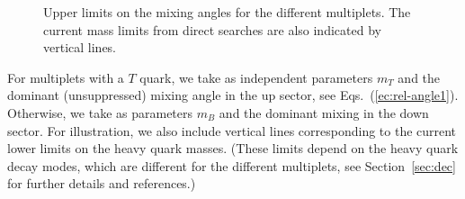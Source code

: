 \documentclass[12pt,a4paper]{article}
\begin{document}
\begin{figure}[p]
\begin{center}
\caption{Upper limits on the mixing angles for the different multiplets. The current mass limits from direct searches are also indicated by vertical lines.}
\label{fig:lim}
\end{center}
\end{figure}
%
For multiplets with a $T$ quark, we take as independent parameters $m_T$ and the dominant (unsuppressed) mixing angle in the up sector, see Eqs.~(\ref{ec:rel-angle1}). Otherwise, we take as parameters $m_B$ and the dominant mixing in the down sector. For illustration, we also include vertical lines corresponding to the current lower limits on the heavy quark masses. (These limits depend on the heavy quark decay modes, which are different for the different multiplets, see Section~\ref{sec:dec} for further details and references.)
\end{document}
